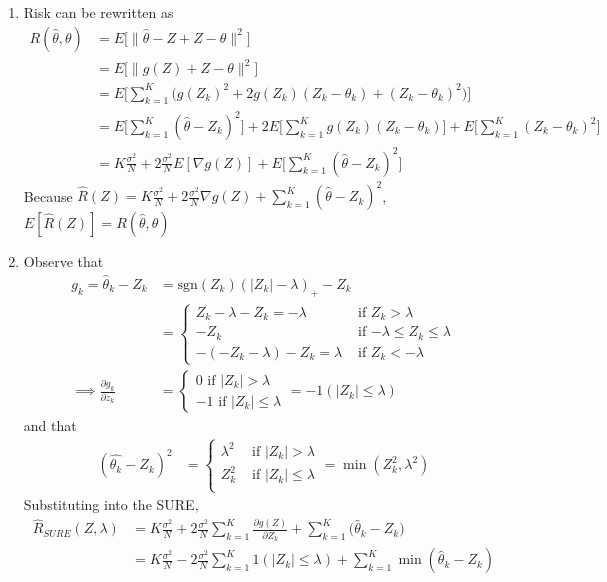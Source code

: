 \documentclass{article}[12pt]
\begin{document}
\begin{enumerate}
    \item Risk can be rewritten as
    \begin{align*}
        R(\hat{\theta}, \theta) &= E \bigg[ \| \hat{\theta} - Z + Z - \theta \|^2 \bigg] \\
        &= E \bigg[ \| g(Z) + Z - \theta \|^2 \bigg] \\
        &= E \bigg[ \sum_{k=1}^K \bigg( g(Z_k)^2 + 2 g(Z_k)(Z_k-\theta_k) + (Z_k - \theta_k)^2 \bigg) \bigg] \\
        &= E \bigg[ \sum_{k=1}^K (\hat{\theta}-Z_k)^2 \bigg] + 2E \bigg[ \sum_{k=1}^K g(Z_k)(Z_k-\theta_k) \bigg] + E \bigg[ \sum_{k=1}^K (Z_k - \theta_k)^2 \bigg] \\
        &= K \frac{\sigma^2}{N} + 2 \frac{\sigma^2}{N}E [\nabla g(Z)] + E \bigg[ \sum_{k=1}^K (\hat{\theta}-Z_k)^2 \bigg]
    \end{align*}
    Because $\hat{R}(Z) = K \frac{\sigma^2}{N} + 2 \frac{\sigma^2}{N} \nabla g(Z) + \sum_{k=1}^K (\hat{\theta}-Z_k)^2$, $E[\hat{R}(Z)] = R(\hat{\theta}, \theta)$

    \item Observe that
    \begin{align*}
        g_k = \hat{\theta}_k - Z_k  &= \text{sgn}(Z_k) (|Z_k| - \lambda)_+ - Z_k \\
        &=
        \begin{cases}
            Z_k - \lambda - Z_k = -\lambda &\mbox{ if $Z_k > \lambda$} \\
            - Z_k &\mbox{ if $-\lambda \leq Z_k \leq \lambda$} \\
            -( - Z_k - \lambda) - Z_k = \lambda &\mbox{ if $Z_k < -\lambda$}
        \end{cases}\\
        \implies \frac{\partial g_k}{\partial z_k} &=
        \begin{cases}
            0 \mbox{ if $|Z_k| > \lambda$} \\
            -1 \mbox{ if $|Z_k| \leq \lambda$}
        \end{cases} = -1(|Z_k| \leq \lambda)
    \end{align*}
    and that
    \begin{align*}
        (\hat{\theta_k} - Z_k)^2 &=
        \begin{cases}
            \lambda^2 &\mbox{ if $|Z_k| > \lambda$} \\
            Z_k^2 &\mbox{ if $|Z_k| \leq \lambda$} \\
        \end{cases}
        = \min (Z_k^2, \lambda^2)
    \end{align*}
    Substituting into the SURE,
    \begin{align*}
        \hat{R}_{SURE} (Z, \lambda) &= K \frac{\sigma^2}{N} + 2 \frac{\sigma^2}{N} \sum_{k=1}^K \frac{\partial g(Z)}{\partial Z_k} + \sum_{k=1}^K \bigg( \hat{\theta}_k- Z_k \bigg) \\
        &= K \frac{\sigma^2}{N} - 2 \frac{\sigma^2}{N} \sum_{k=1}^K 1(|Z_k| \leq \lambda) + \sum_{k=1}^K \min (\hat{\theta}_k - Z_k )
    \end{align*}


\end{enumerate}
\end{document}
